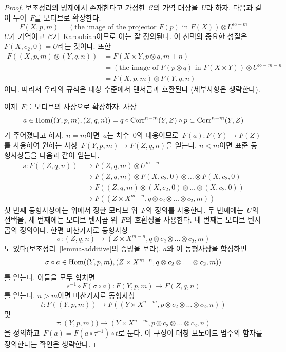 \begin{proof}
보조정리의 명제에서 존재한다고 가정한\  $\mathcal{C}$의 가역 대상을\ 
$U$라 하자. 다음과 같이 두어\  $F$를 모티브로 확장한다.
$$
F(X, p, m) = \left(\text{the image of
the projector }F(p)\text{ in }F(X)\right) \otimes U^{\otimes -m}
$$
$U$가 가역이고\  $\mathcal{C}$가\  Karoubian이므로 이는 잘 정의된다.
이 선택의 중요한 성질은\  $F(X, c_2, 0) = U$라는 것이다. 또한
\begin{align*}
F((X, p, m) \otimes (Y, q, n))
& =
F(X \times Y, p \otimes q, m + n) \\
& =
\left(\text{the image of }F(p \otimes q)\text{ in }F(X \times Y)\right)
\otimes U^{\otimes -m - n} \\
& =
F(X, p, m) \otimes F(Y, q, n)
\end{align*}
이다. 따라서 우리의 규칙은 대상 수준에서 텐서곱과 호환된다
(세부사항은 생략한다).

\medskip\noindent
이제\  $F$를 모티브의 사상으로 확장하자. 사상
$$
a \in
\mathop{\mathrm{Hom}}\nolimits((Y, p, m), (Z, q, n)) =
q \circ \text{Corr}^{n - m}(Y, Z) \circ p \subset \text{Corr}^{n - m}(Y, Z)
$$
가 주어졌다고 하자. $n = m$이면\  $a$는 차수\  $0$의 대응이므로\ 
$F(a) : F(Y) \to F(Z)$를 사용하여 원하는 사상\ 
$F(Y, p, m) \to F(Z, q, n)$을 얻는다. $n < m$이면 표준 동형사상들을
다음과 같이 얻는다.
\begin{align*}
s : F((Z, q, n))
& \to
F(Z, q, m) \otimes U^{m - n} \\
& \to
F(Z, q, m) \otimes F(X, c_2, 0) \otimes \ldots \otimes F(X, c_2, 0) \\
& \to
F((Z, q, m) \otimes (X, c_2, 0) \otimes \ldots \otimes (X, c_2, 0)) \\
& \to
F((Z \times X^{m - n}, q \otimes c_2 \otimes \ldots \otimes c_2, m))
\end{align*}
첫 번째 동형사상에는 위에서 정한 모티브 위\  $F$의 정의를 사용한다.
두 번째에는\  $U$의 선택을, 세 번째에는 모티브 텐서곱 위\  $F$의
호환성을 사용한다. 네 번째는 모티브 텐서곱의 정의이다. 한편 마찬가지로
동형사상
$$
\sigma : (Z, q, n) \to
(Z \times X^{m - n}, q \otimes c_2 \otimes \ldots \otimes c_2, m)
$$
도 있다(보조정리\  \ref{lemma-additive}의 증명을 보라). $a$와 이
동형사상을 합성하면
$$
\sigma \circ a \in
\mathop{\mathrm{Hom}}\nolimits((Y, p, m),
(Z \times X^{m - n}, q \otimes c_2 \otimes \ldots \otimes c_2, m))
$$
를 얻는다. 이들을 모두 합치면
$$
s^{-1} \circ F(\sigma \circ a) :
F(Y, p, m) \to
F(Z, q, n)
$$
를 얻는다. $n > m$이면 마찬가지로 동형사상
$$
t : F((Y, p, m)) \to
F((Y \times X^{n - m}, p \otimes c_2 \otimes \ldots \otimes c_2, n))
$$
및
$$
\tau : (Y, p, m)) \to
(Y \times X^{n - m}, p \otimes c_2 \otimes \ldots \otimes c_2, n)
$$
을 정의하고\  $F(a) = F(a \circ \tau^{-1}) \circ t$로 둔다.
이 구성이 대칭 모노이드 범주의 함자를 정의한다는 확인은 생략한다.
\end{proof}

